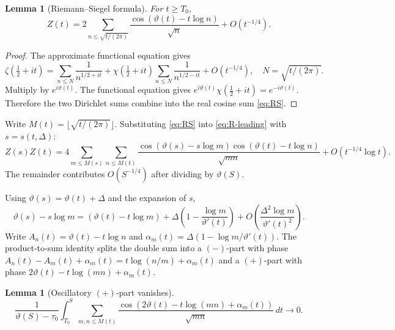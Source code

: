 \documentclass[11pt]{article}
\numberwithin{equation}{section}
\theoremstyle{plain}
\newtheorem{lemma}[theorem]{Lemma}
\theoremstyle{definition}
\begin{document}
\begin{lemma}[Riemann--Siegel formula]
For \(t\ge T_0\),
\begin{equation}
Z(t)
=
2\sum_{n\le \sqrt{t/(2\pi)}}
\frac{\cos(\vartheta(t)-t\log n)}{\sqrt{n}}
+O(t^{-1/4}).
\label{eq:RS}
\end{equation}
\end{lemma}

\begin{proof}
The approximate functional equation gives
\[
\zeta\!\left(\tfrac12+it\right)
=\sum_{n\le N}\frac{1}{n^{1/2+it}}
+\chi\!\left(\tfrac12+it\right)\sum_{n\le N}\frac{1}{n^{1/2-it}}
+O(t^{-1/4}),
\quad N=\sqrt{t/(2\pi)}.
\]
Multiply by \(e^{i\vartheta(t)}\). The functional equation gives
\(e^{i\vartheta(t)}\chi(\frac12+it)=e^{-i\vartheta(t)}\). Therefore the two Dirichlet
sums combine into the real cosine sum \eqref{eq:RS}.
\end{proof}

Write \(M(t)=\lfloor\sqrt{t/(2\pi)}\rfloor\). Substituting \eqref{eq:RS} into
\eqref{eq:R-leading} with \(s=s(t,\Delta)\):
\begin{equation}
Z(s)Z(t)
=4\sum_{m\le M(s)}\sum_{n\le M(t)}
\frac{\cos(\vartheta(s)-s\log m)\cos(\vartheta(t)-t\log n)}{\sqrt{mn}}
+O(t^{-1/4}\log t).
\label{eq:ZZ}
\end{equation}
The remainder contributes \(O(S^{-1/4})\) after dividing by \(\vartheta(S)\).

Using \(\vartheta(s)=\vartheta(t)+\Delta\) and the expansion of \(s\),
\[
\vartheta(s)-s\log m
=(\vartheta(t)-t\log m)
+\Delta\!\left(1-\frac{\log m}{\vartheta'(t)}\right)
+O\!\left(\frac{\Delta^2\log m}{\vartheta'(t)^2}\right).
\]
Write \(A_n(t)=\vartheta(t)-t\log n\) and
\(\alpha_m(t)=\Delta(1-\log m/\vartheta'(t))\).
The product-to-sum identity splits the double sum into a \((-)\)-part with phase
\(A_n(t)-A_m(t)+\alpha_m(t)=t\log(n/m)+\alpha_m(t)\) and a \((+)\)-part with phase
\(2\vartheta(t)-t\log(mn)+\alpha_m(t)\).

\begin{lemma}[Oscillatory \((+)\)-part vanishes]
\[
\frac{1}{\vartheta(S)-\tau_0}
\int_{T_0}^S
\sum_{m,n\le M(t)}
\frac{\cos(2\vartheta(t)-t\log(mn)+\alpha_m(t))}{\sqrt{mn}}
\,dt
\to 0.
\]
\end{lemma}
\end{document}
